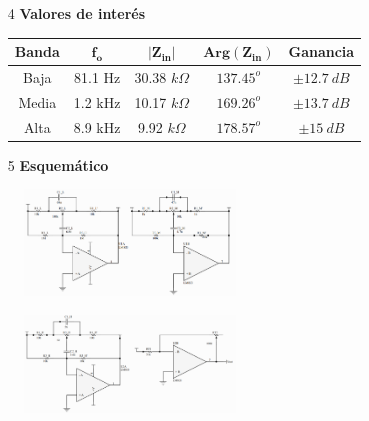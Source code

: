 \begin{multicols}{2}
\begin{enumerate}
	\item[4] \textbf{Valores de interés}
	\begin{table}[H]
		\begin{tabular}{ccccc}
			\hline			
			\textbf{Banda} & $\mathbf{f_o}$ & $\mathbf{|Z_{in}|}$ & $\mathbf{Arg\left(Z_{in}\right)}$ & \textbf{Ganancia} \\
			\hline
			Baja           & 81.1 Hz                     & 30.38 $k\Omega$     & $137.45^o$                           & $\pm 12.7 \ dB$          \\
			Media          & 1.2 kHz                     & 10.17 $k\Omega$      & $169.26^o$                           & $\pm 13.7 \ dB$          \\
			Alta           & 8.9 kHz                       & 9.92 $k\Omega$      & $178.57^o$                            & $\pm 15 \ dB$         	\\
			\hline
		\end{tabular}
	\end{table}

\end{enumerate}
\end{multicols}

\begin{enumerate}
	\item[5] \textbf{Esquemático}\\
\end{enumerate}

\begin{multicols}{2}
\centering
	\begin{figure}[H]
		\includegraphics[width=0.5\textwidth]{Imagenes/Schematic-1.png}
	\end{figure}
	\begin{figure}[H]
			\includegraphics[width=0.5\textwidth]{Imagenes/Schematic-2.png}
	\end{figure}
\end{multicols}

